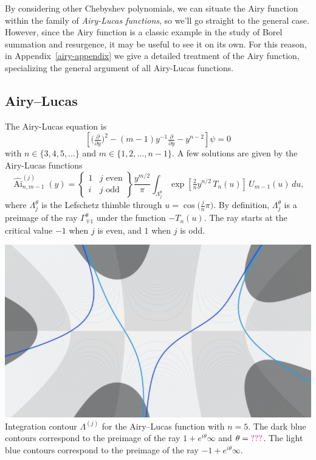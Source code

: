 \documentclass{article}
\DeclareMathOperator{\Ai}{Ai}
\theoremstyle{definition}
\theoremstyle{plain}
\begin{document}
By considering other Chebyshev polynomials, we can situate the Airy function within the family of {\em Airy-Lucas functions}, so we’ll go straight to the general case. However, since the Airy function is a classic example in the study of Borel summation and resurgence, it may be useful to see it on its own. For this reason, in Appendix~\ref{airy-appendix} we give a detailed treatment of the Airy function, specializing the general argument of all Airy-Lucas functions.

\subsection{Airy--Lucas}\label{example_AL}
The Airy-Lucas equation is
\begin{equation}\label{eqn:airy-lucas}
\left[\big(\tfrac{\partial}{\partial y}\big)^2 - (m-1) y^{-1} \tfrac{\partial}{\partial y} - y^{n-2}\right] \psi = 0
\end{equation}
with $n \in \{3, 4, 5, \ldots\}$ and $m \in \{1, 2, \ldots, n-1\}$. A few solutions are given by the Airy-Lucas functions~\cite[equation~3.6]{charbonnier22}
\[ \widehat{\Ai}^{(j)}_{n, m-1}(y) = \left\{\begin{array}{ll}1 & j \text{ even} \\ i & j \text{ odd}\end{array}\right\} \frac{y^{m/2}}{\pi} \int_{\Lambda^\theta_j} \exp\left[\tfrac{2}{n} y^{n/2}\,T_n(u)\right]\,U_{m-1}(u)\,du, \]
where $\Lambda^\theta_j$ is the Lefschetz thimble through $u = \cos\big(\tfrac{j}{n}\pi\big)$. %
By definition, $\Lambda^\theta_j$ is a preimage of the ray $\Gamma^\theta_{\mp 1}$ under the function $-T_n(u)$. The ray starts at the critical value $-1$ when $j$ is even, and $1$ when $j$ is odd.
\begin{center}
\includegraphics[scale=0.3]{figures/thimble-n5.png} \\[1em]
{\small Integration contour $\Lambda^{(j)}$ for the Airy--Lucas function with $n=5$. The dark blue contours correspond to the preimage of the ray $1+e^{i\theta}\infty$ and $\theta=\textcolor{magenta}{???}$. The light blue contours correspond to the preimage of the ray $-1+e^{i\theta}\infty$.}
\end{center}
\end{document}
